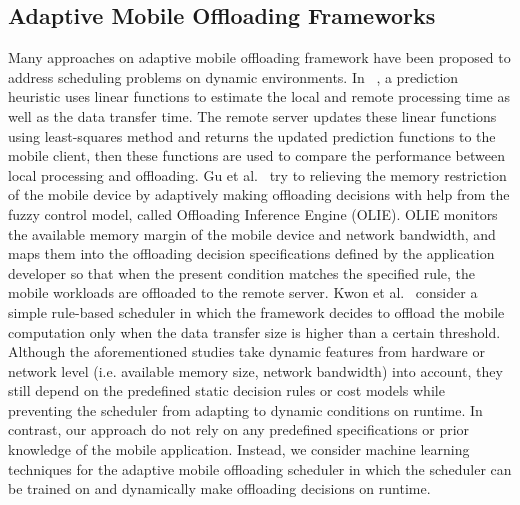 \documentclass[10pt, conference, compsocconf]{IEEEtran}
\begin{document}
\subsection{Adaptive Mobile Offloading Frameworks}
%
Many approaches on adaptive mobile offloading framework have been
proposed to address scheduling problems on dynamic environments.
%
In ~\cite{shigeru}, a prediction heuristic uses linear functions to
estimate the local and remote processing time as well as the data
transfer time.
%
The remote server updates these linear functions using least-squares
method and returns the updated prediction functions to the mobile client,
then these functions are used to compare the performance between local
processing and offloading.
%
Gu et al.~\cite{xiaohui} try to relieving the memory restriction of the
mobile device by adaptively making offloading decisions with help from
the fuzzy control model, called Offloading Inference Engine (OLIE).
%
OLIE monitors the available memory margin of the mobile device and
network bandwidth, and maps them into the offloading decision
specifications defined by the application developer so that when the
present condition matches the specified rule, the mobile workloads are
offloaded to the remote server.
%
Kwon et al.~\cite{kwon} consider a simple rule-based
scheduler in which the framework decides to offload the mobile
computation only when the data transfer size is higher than a certain
threshold.\\
%
\indent Although the aforementioned studies take dynamic features
from hardware or network level (i.e. available memory size, network
bandwidth) into account, they still depend on the predefined static
decision rules or cost models while preventing the scheduler from
adapting to dynamic conditions on runtime.
%
In contrast, our approach do not rely on any predefined specifications
or prior knowledge of the mobile application.
%
Instead, we consider machine learning techniques for the adaptive mobile
offloading scheduler in which the scheduler can be trained on and 
dynamically make offloading decisions on runtime. 
%
\end{document}
